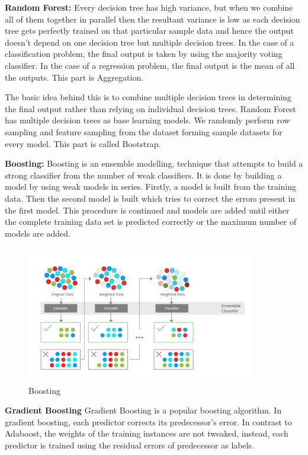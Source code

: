 \documentclass[12pt]{article}
\begin{document}
\textbf{Random Forest:}
Every decision tree has high variance, but when we combine all of them together in parallel then the resultant variance is low as each decision tree gets perfectly trained on that particular sample data and hence the output doesn’t depend on one decision tree but multiple decision trees. In the case of a classification problem, the final output is taken by using the majority voting classifier. In the case of a regression problem, the final output is the mean of all the outputs. This part is Aggregation.
 

The basic idea behind this is to combine multiple decision trees in determining the final output rather than relying on individual decision trees.
Random Forest has multiple decision trees as base learning models. We randomly perform row sampling and feature sampling from the dataset forming sample datasets for every model. This part is called Bootstrap.

\textbf{Boosting:}
Boosting is an ensemble modelling, technique that attempts to build a strong classifier from the number of weak classifiers. It is done by building a model by using weak models in series. Firstly, a model is built from the training data. Then the second model is built which tries to correct the errors present in the first model. This procedure is continued and models are added until either the complete training data set is predicted correctly or the maximum number of models are added.

\begin{figure}[H]
\begin{center}
 \includegraphics[width=10cm, height=6cm]{Tech2}
\caption{Boosting}
\end{center}
\end{figure}

\textbf{Gradient Boosting }
Gradient Boosting is a popular boosting algorithm. In gradient boosting, each predictor corrects its predecessor’s error. In contrast to Adaboost, the weights of the training instances are not tweaked, instead, each predictor is trained using the residual errors of predecessor as labels.
\end{document}
